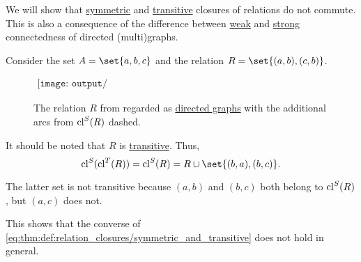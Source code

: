 \begin{example}\label{ex:thm:def:relation_closures/symmetric_and_transitive}
  We will show that \hyperref[def:relation_closures/symmetric]{symmetric} and \hyperref[def:relation_closures/transitive]{transitive} closures of relations do not commute. This is also a consequence of the difference between \hyperref[def:graph_connectedness/weak]{weak} and \hyperref[def:graph_connectedness/strong]{strong} connectedness of directed (multi)graphs.

  Consider the set \( A = \set{ a, b, c } \) and the relation \( R = \set{ (a, b), (c, b) } \).

  \begin{figure}[!ht]
    \begin{equation*}
      \begin{aligned}
        \texttt{[image: output/ex\_\_thm\_\_def\_\_relation\_closures\_\_symmetric\_and\_transitive]}
      \end{aligned}
    \end{equation*}
    \caption{The relation \( R \) from  regarded as \hyperref[def:directed_graph]{directed graphs} with the additional arcs from \( \operatorname{cl}^S(R) \) dashed.}\label{fig:ex:thm:def:relation_closures/symmetric_and_transitive}
  \end{figure}

  It should be noted that \( R \) is \hyperref[def:binary_relation/transitive]{transitive}. Thus,
  \begin{equation*}
    \cl^S(\cl^T(R)) = \cl^S(R) = R \cup \set{ (b, a), (b, c) }.
  \end{equation*}

  The latter set is not transitive because \( (a, b) \) and \( (b, c) \) both belong to \( \operatorname{cl}^S(R) \), but \( (a, c) \) does not.

  This shows that the converse of \eqref{eq:thm:def:relation_closures/symmetric_and_transitive} does not hold in general.
\end{example}

